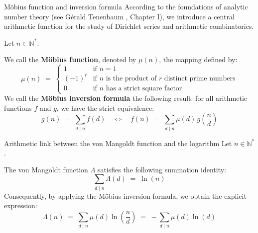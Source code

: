 \documentclass[Riemann_Hypothesis.tex]{subfiles}
\begin{document}
\begin{DefNefEn}[label=df:MobiusInversion]{Möbius function and inversion formula}
    According to the foundations of analytic number theory 
    (see Gérald Tenenbaum \cite{tenenbaum2015_intro_en}, Chapter I), we introduce a central arithmetic function for the study of Dirichlet series and arithmetic combinatorics. \par
    Let $n \in \mathbb{N}^*$. \par
    We call the \textbf{Möbius function}, denoted by $\mu(n)$, the mapping defined by:
    \begin{equation*}
        \mu(n) \;=\; 
        \begin{cases}
            1 & \text{if } n = 1 \\
            (-1)^r & \text{if } n \text{ is the product of } r \text{ distinct prime numbers} \\
            0 & \text{if } n \text{ has a strict square factor}
        \end{cases}
    \end{equation*}
    We call the \textbf{Möbius inversion formula} the following result: for all arithmetic functions $f$ and $g$, we have the strict equivalence:
    \begin{equation*}
        g(n) \;=\; \sum_{d \mid n} f(d) \quad \iff \quad f(n) \;=\; \sum_{d \mid n} \mu(d) \, g\left(\frac{n}{d}\right)
    \end{equation*}
\end{DefNefEn}


\begin{propositionEn}[label=pr:LienMangoldtLog]{Arithmetic link between the von Mangoldt function and the logarithm}
    Let $n \in \mathbb{N}^*$. \par
    The von Mangoldt function $\Lambda$ satisfies the following summation identity:
    \begin{equation*}
        \sum_{d \mid n} \Lambda(d) \;=\; \ln(n)
    \end{equation*}
    Consequently, by applying the Möbius inversion formula, we obtain the explicit expression:
    \begin{equation*}
        \Lambda(n) \;=\; \sum_{d \mid n} \mu(d) \ln\left(\frac{n}{d}\right) \;=\; -\sum_{d \mid n} \mu(d) \ln(d)
    \end{equation*}
\end{propositionEn}
\end{document}
